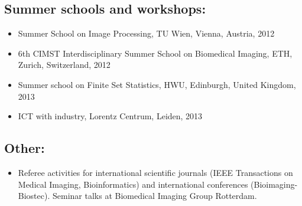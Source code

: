 \subsection*{Summer schools and workshops:}
\vspace{1ex}
\begin{itemize}
	\item Summer School on Image Processing, TU Wien, Vienna, Austria, 2012
	
	\item 6th CIMST Interdisciplinary Summer School on Biomedical Imaging, ETH, Zurich, Switzerland, 2012
	
	\item Summer school on Finite Set Statistics, HWU, Edinburgh, United Kingdom, 2013
	
	\item ICT with industry, Lorentz Centrum, Leiden, 2013
\end{itemize}

\subsection*{Other:}
\vspace{1ex}
\begin{itemize}
	\item Referee activities for international scientific journals (IEEE Transactions on Medical Imaging, Bioinformatics) and international conferences (Bioimaging-Biostec). Seminar talks at Biomedical Imaging Group Rotterdam.
\end{itemize}
